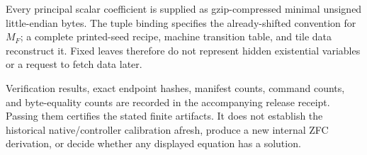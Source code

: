 Every principal scalar coefficient is supplied as gzip-compressed minimal unsigned little-endian bytes. The tuple binding specifies the already-shifted convention for $M_F$; a complete printed-seed recipe, machine transition table, and tile data reconstruct it. Fixed leaves therefore do not represent hidden existential variables or a request to fetch data later.

Verification results, exact endpoint hashes, manifest counts, command counts, and byte-equality counts are recorded in the accompanying release receipt. Passing them certifies the stated finite artifacts. It does not establish the historical native/controller calibration afresh, produce a new internal ZFC derivation, or decide whether any displayed equation has a solution.
